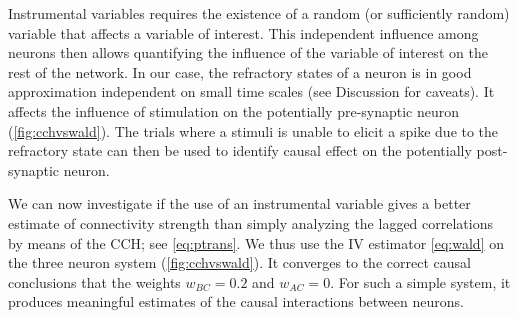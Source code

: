 \documentclass[11pt]{article}
\begin{document}
Instrumental variables requires the existence of a random (or sufficiently random) variable that affects a variable of interest. This independent influence among neurons then allows quantifying the influence of the variable of interest on the rest of the network. In our case, the refractory states of a neuron is in good approximation independent on small time scales (see Discussion for caveats). It affects the influence of stimulation on the potentially pre-synaptic neuron (\cref{fig:cchvswald}). The trials where a stimuli is unable to elicit a spike due to the refractory state can then be used to identify causal effect on the potentially post-synaptic neuron.

We can now investigate if the use of an instrumental variable gives a better estimate of connectivity strength than simply analyzing the lagged correlations by means of the CCH; see \cref{eq:ptrans}. We thus use the IV estimator \cref{eq:wald} on the three neuron system (\cref{fig:cchvswald}). It converges to the correct causal conclusions that the weights $ w_{BC} = 0.2 $ and $ w_{AC} = 0 $. For such a simple system, it produces meaningful estimates of the causal interactions between neurons.
\end{document}
